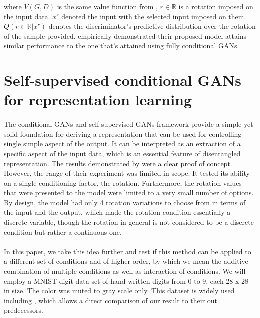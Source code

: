 \documentclass[11pt, letterpaper, oneside]{article}
\begin{document}
where $V(G, D)$ is the same value function from , $r \in \mathbb{R}$ is a rotation imposed on the input data. $x^r$ denoted the input with the selected input imposed on them. $Q( r \in \mathbb{R} | x^r )$ denotes the discriminator's predictive distribution over the rotation of the sample provided. \cite{chen_self-supervised_2019} empirically demonstrated their proposed model attains similar performance to the one that's attained using fully conditional GANs.
  
\section{Self-supervised conditional GANs for representation learning} \label{SScGANs}
\paragraph{}
The conditional GANs and self-supervised GANs framework provide a simple yet solid foundation for deriving a representation that can be used for controlling single simple aspect of the output. It can be interpreted as an extraction of a specific aspect of the input data, which is an essential feature of disentangled representation. The results demonstrated by \cite{chen_self-supervised_2019} were a clear proof of concept. However, the range of their experiment was limited in scope. It tested its ability on a single conditioning factor, the rotation. Furthermore, the rotation values that were presented to the model were limited to a very small number of options. By design, the model had only 4 rotation variations to choose from in terms of the input and the output, which made the rotation condition essentially a discrete variable, though the rotation in general is not considered to be a discrete condition but rather a continuous one.
\paragraph{}
In this paper, we take this idea further and test if this method can be applied to a different set of conditions and of higher order, by which we mean the additive combination of multiple conditions as well as interaction of conditions. We will employ a MNIST digit data set of hand written digits from 0 to 9, each 28 x 28 in size. The color was muted to gray scale only. This dataset is widely used including \cite{chen_self-supervised_2019}, which allows a direct comparison of our result to their out predecessors. 
\end{document}
